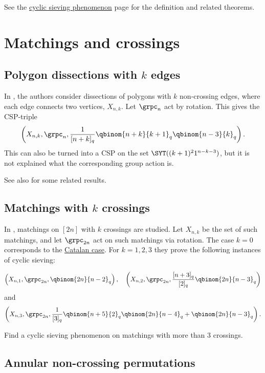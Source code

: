 
See the \hyperref[cyclicSieving]{cyclic sieving phenomenon}
page for the definition and related theorems.


\section[cspMatch]{Matchings and crossings}


\subsection[cspPolygon]{Polygon dissections with $k$ edges}

In \cite{ReinerStantonWhite2004}, the authors consider dissections of polygons with $k$ non-crossing edges,
where each edge connects two vertices, $X_{n,k}$. Let $\grpc_{n}$ act by rotation.
This gives the CSP-triple
\[
\left( X_{n,k}, \grpc_{n}, \frac{1}{[n+k]_q}\qbinom{n+k}{k+1}_q \qbinom{n-3}{k}_q \right).
\]
This can also be turned into a CSP on the set $\SYT((k+1)^2 1^{n-k-3})$, but
it is not explained what the corresponding group action is.


See also \cite{BowmanRegev2014} for some related results.

\subsection[cspMatchings]{Matchings with $k$ crossings}

In \cite{LiangBowling2017x}, matchings on $[2n]$ with $k$ crossings are studied.
Let $X_{n,k}$ be the set of such matchings, and let $\grpc_{2n}$ act on such matchings via rotation.
The case $k=0$ corresponds to the \hyperref[cspNonCrossingMatchingsI]{Catalan case}.
For $k=1,2,3$ they prove the following instances of cyclic sieving:

\[
\left( X_{n,1}, \grpc_{2n}, \qbinom{2n}{n-2}_q \right)
,
\quad
\left( X_{n,2}, \grpc_{2n},  \frac{[n+3]_q}{[2]_q}  \qbinom{2n}{n-3}_q \right)
\]
and
\[
\left( X_{n,3}, \grpc_{2n},  \frac{1}{[3]_q} \qbinom{n+5}{2}_q \qbinom{2n}{n-4}_q + \qbinom{2n}{n-3}_q  \right).
\]

\begin{problem}
Find a cyclic sieving phenomenon on matchings with more than $3$ crossings.
\end{problem}


\subsection[cspAnnularNonCrossingPermutations]{Annular non-crossing permutations}

